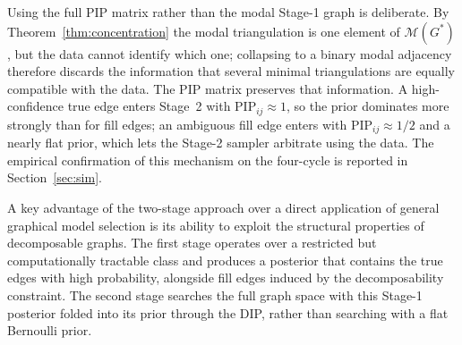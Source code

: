 Using the full PIP matrix rather than the modal Stage-1 graph is deliberate. By Theorem~\ref{thm:concentration} the modal triangulation is one element of $\mathcal{M}(G^*)$, but the data cannot identify which one; collapsing to a binary modal adjacency therefore discards the information that several minimal triangulations are equally compatible with the data. The PIP matrix preserves that information. A high-confidence true edge enters Stage~2 with $\text{PIP}_{ij} \approx 1$, so the prior dominates more strongly than for fill edges; an ambiguous fill edge enters with $\text{PIP}_{ij} \approx 1/2$ and a nearly flat prior, which lets the Stage-2 sampler arbitrate using the data. The empirical confirmation of this mechanism on the four-cycle is reported in Section~\ref{sec:sim}.

A key advantage of the two-stage approach over a direct application of general graphical model selection is its ability to exploit the structural properties of decomposable graphs. The first stage operates over a restricted but computationally tractable class and produces a posterior that contains the true edges with high probability, alongside fill edges induced by the decomposability constraint. The second stage searches the full graph space with this Stage-1 posterior folded into its prior through the DIP, rather than searching with a flat Bernoulli prior.

